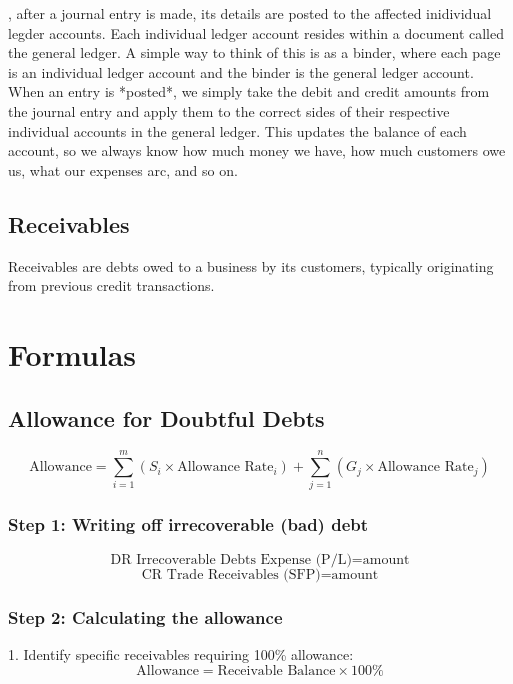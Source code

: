   , after a journal entry is made, its details are posted to the affected inidividual legder accounts. Each individual ledger account resides within a document called the general ledger. A simple way to think of this is as a binder, where each page is an individual ledger account and the binder is the general ledger account. When an entry is *posted*, we simply take the debit and credit amounts from the journal entry and apply them to the correct sides of their respective individual accounts in the general ledger. This updates the balance of each account, so we always know how much money we have, how much customers owe us, what our expenses arc, and so on.

  



\newpage
\subsection{Receivables}

Receivables are debts owed to a business by its customers, typically originating from previous credit transactions. 



\section{Formulas}

\subsection{Allowance for Doubtful Debts}

\[
\text{Allowance} = \sum_{i=1}^{m} (S_i \times \text{Allowance Rate}_i) + \sum_{j=1}^{n} (G_j \times \text{Allowance Rate}_j)
\]

\subsubsection{Step 1: Writing off irrecoverable (bad) debt}

\[
\text{DR Irrecoverable Debts Expense (P/L)} = \text{amount}
\]
\[
\text{CR Trade Receivables (SFP)} = \text{amount}
\]

\subsubsection{Step 2: Calculating the allowance}

1. Identify specific receivables requiring 100\% allowance:
\[
\text{Allowance} = \text{Receivable Balance} \times 100\%
\]

